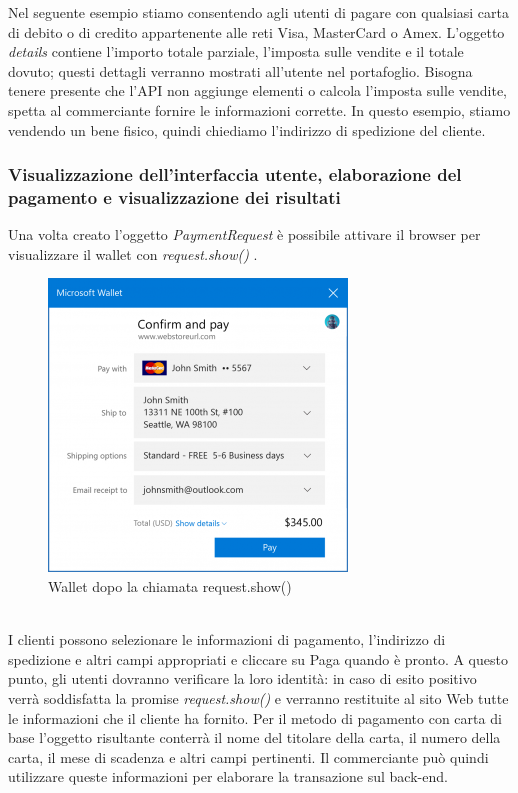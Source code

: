 \documentclass[11pt ,a4paper , twoside , openright ]{article}
\begin{document}
Nel seguente esempio stiamo consentendo agli utenti di pagare con qualsiasi carta di debito o di credito appartenente alle reti Visa, MasterCard o Amex. L'oggetto \textit{details} contiene l'importo totale parziale, l'imposta sulle vendite e il totale dovuto; questi dettagli verranno mostrati all'utente nel portafoglio. Bisogna tenere presente che l'API non aggiunge elementi o calcola l'imposta sulle vendite, spetta al commerciante fornire le informazioni corrette. In questo esempio, stiamo vendendo un bene fisico, quindi chiediamo l'indirizzo di spedizione del cliente.

\subsubsection{Visualizzazione dell'interfaccia utente, elaborazione del pagamento e visualizzazione dei risultati}
Una volta creato l'oggetto \textit{PaymentRequest} è possibile attivare il browser per visualizzare il wallet con \textit{request.show()} \cite{rif12}. 
\begin{figure}[h]
	\centering
	\includegraphics[width=0.5\linewidth]{wallet1}
	\caption{Wallet dopo la chiamata request.show()}
	\label{fig: Wallet dopo la chiamata request.show()}
\end{figure}
\\
\pagebreak
I clienti possono  selezionare le informazioni di pagamento, l'indirizzo di spedizione e altri campi appropriati e cliccare su Paga quando è pronto. A questo punto, gli utenti dovranno verificare la loro identità: in caso di esito positivo verrà soddisfatta la promise \textit{request.show()} e verranno restituite al sito Web tutte le informazioni che il cliente ha fornito. Per il metodo di pagamento con carta di base l'oggetto risultante conterrà il nome del titolare della carta, il numero della carta, il mese di scadenza e altri campi pertinenti. Il commerciante può quindi utilizzare queste informazioni per elaborare la transazione sul back-end.
\end{document}
